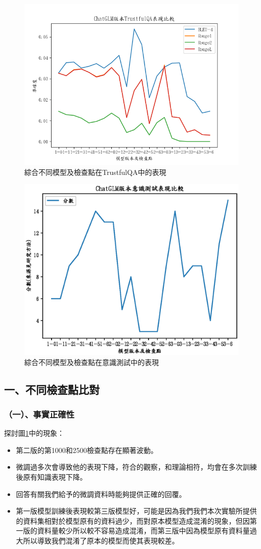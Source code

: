 \documentclass[12pt,a4paper,MingLiU,UTF8,natbib]{article}
\begin{document}
	\begin{figure}[H]
		\centering
		\includegraphics[width=.5\textwidth]{mixscorenew}
		\caption{綜合不同模型及檢查點在TrustfulQA中的表現}
		\label{pic1:mixtscore}
	\end{figure}

	\begin{figure}[H]
		\centering
		\includegraphics[width=.5\textwidth]{mixctscore}
		\caption{綜合不同模型及檢查點在意識測試中的表現}
		\label{pic2:mixcscore}
	\end{figure}

	\subsection{一、不同檢查點比對}
	
	\subsubsection{（一）、事實正確性}
	探討圖\ref{pic1:mixtscore}中的現象：
	
	\begin{itemize}
		\item 第二版的第1000和2500檢查點存在顯著波動。
		\item 微調過多次會導致他的表現下降，符合的觀察，和理論相符，均會在多次訓練後原有知識表現下降。
		\item 回答有關我們給予的微調資料時能夠提供正確的回覆。
		\item 第一版模型訓練後表現較第三版模型好，可能是因為我們我們本次實驗所提供的資料集相對於模型原有的資料過少，而對原本模型造成混淆的現象，但因第一版的資料量較少所以較不容易造成混淆，而第三版中因為模型原有資料量過大所以導致我們混淆了原本的模型而使其表現較差。
	\end{itemize}
\end{document}
